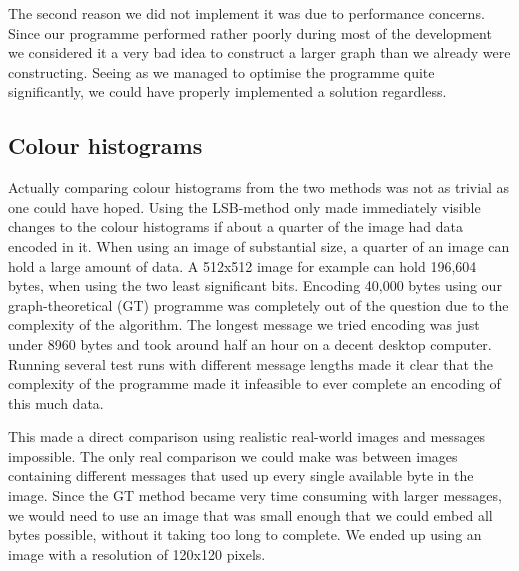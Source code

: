 The second reason we did not implement it was due to performance concerns.
Since our programme performed rather poorly during most of the development we considered it a very bad idea to construct a larger graph than we already were constructing.
Seeing as we managed to optimise the programme quite significantly, we could have properly implemented a solution regardless.

\subsection{Colour histograms}
Actually comparing colour histograms from the two methods was not as trivial as one could have hoped.
Using the LSB-method only made immediately visible changes to the colour histograms if about a quarter of the image had data encoded in it.
When using an image of substantial size, a quarter of an image can hold a large amount of data. 
A 512x512 image for example can hold 196,604 bytes, when using the two least significant bits.
Encoding 40,000 bytes using our graph-theoretical (GT) programme was completely out of the question due to the complexity of the algorithm.
The longest message we tried encoding was just under 8960 bytes and took around half an hour on a decent desktop computer.
Running several test runs with different message lengths made it clear that the complexity of the programme made it infeasible to ever complete an encoding of this much data.

This made a direct comparison using realistic real-world images and messages impossible. 
The only real comparison we could make was between images containing different messages that used up every single available byte in the image.
Since the GT method became very time consuming with larger messages, we would need to use an image that was small enough that we could embed all bytes possible, without it taking too long to complete.
We ended up using an image with a resolution of 120x120 pixels.

